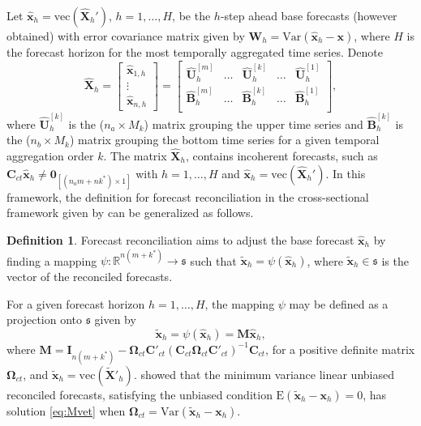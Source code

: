 \documentclass[12pt]{article}
\newcommand{\xvet}{\bm{x}}
\newcommand{\Bvet}{\bm{B}}
\newcommand{\Cvet}{\bm{C}}
\newcommand{\Ivet}{\bm{I}}
\newcommand{\Mvet}{\bm{M}}
\newcommand{\Uvet}{\bm{U}}
\newcommand{\Xvet}{\bm{X}}
\newcommand{\Zerovet}{\bm{0}}
\newcommand{\Omegavet}{\bm{\Omega}}
\theoremstyle{definition}
\newtheorem{definition}{Definition}[section]
\begin{document}
Let $\widehat{\xvet}_{h} = \mathrm{vec}(\widehat{\Xvet}_{h}')$, $h = 1, \dots, H$, be the $h$-step ahead base forecasts (however obtained) with error covariance matrix given by $\bm{W}_h = \text{Var}(\widehat{\xvet}_h - \xvet)$, where $H$ is the forecast horizon for the most temporally aggregated time series. Denote
$$
	\widehat{\Xvet}_{h} = \begin{bmatrix}
		\widehat{\xvet}_{1,h} \\[-0.25cm]
		\vdots                \\[-0.25cm]
		\widehat{\xvet}_{n,h}
	\end{bmatrix} =\begin{bmatrix}
		\widehat{\Uvet}_{h}^{[m]} & \dots & \widehat{\Uvet}_{h}^{[k]} & \dots & \widehat{\Uvet}_{h}^{[1]} \\[0.25cm]
		\widehat{\Bvet}_{h}^{[m]} & \dots & \widehat{\Bvet}_{h}^{[k]} & \dots & \widehat{\Bvet}_{h}^{[1]} \\\end{bmatrix},
$$
where $\widehat{\Uvet}_{h}^{[k]}$ is the ($n_a\times M_k$) matrix grouping the upper time series and $\widehat{\Bvet}_{h}^{[k]}$ is the ($n_b\times M_k$) matrix grouping the bottom time series for a given temporal aggregation order $k$. The matrix $\widehat{\Xvet}_{h}$, %
contains incoherent forecasts, such as $\Cvet_{ct} \widehat{\xvet}_{h} \neq \Zerovet_{[(n_am+nk^\ast)\times1]}$
with $h = 1, \dots, H$ and $\widehat{\xvet}_{h} = \mathrm{vec}(\widehat{\Xvet}_{h}')$. In this framework, the definition for forecast reconciliation in the cross-sectional framework given by \cite{panagiotelis2021} can be generalized as follows.

\begin{definition}
	Forecast reconciliation aims to adjust the base forecast $\widehat{\xvet}_{h}$ by finding a mapping $\psi: \mathbb{R}^{n(m+k^\ast)} \rightarrow \mathfrak{s}$ such that $\widetilde{\xvet}_{h} = \psi\left(\widehat{\xvet}_{h}\right)$, where $\widetilde{\xvet}_{h} \in \mathfrak{s}$ is the vector of the reconciled forecasts.
\end{definition}

For a given forecast horizon $h = 1,\dots, H$, the mapping $\psi$ may be defined as a projection onto $\mathfrak{s}$ given by \citep{panagiotelis2021, difonzo2023}
\begin{equation}
	\label{eq:Mvet}
	\widetilde{\xvet}_{h} = \psi\left(\widehat{\xvet}_h\right) = \Mvet \widehat{\xvet}_h,
\end{equation}
where $\Mvet = \Ivet_{n(m+ k^\ast)} - \Omegavet_{ct}\Cvet'_{ct}\left(\Cvet_{ct}\Omegavet_{ct}\Cvet'_{ct}\right)^{-1}\Cvet_{ct}$, for a positive definite matrix $\Omegavet_{ct}$, and $\widetilde{\xvet}_{h} = \mathrm{vec}(\widetilde{\Xvet}'_{h})$.
\citet{wickramasuriya2019} showed that the minimum variance linear unbiased reconciled forecasts, satisfying the unbiased condition $\text{E}(\widetilde{\xvet}_h -\xvet_h) = 0$, has solution \eqref{eq:Mvet} when $\Omegavet_{ct} = \text{Var}(\widetilde{\xvet}_h -\xvet_h)$.
\end{document}
